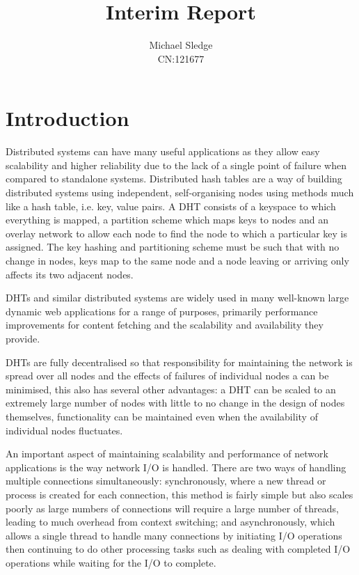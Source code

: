 \documentclass{article}
\begin{document}
\title{Interim Report}
\author{Michael Sledge\\ CN:121677}
\date{}
\maketitle
\section{Introduction}
Distributed systems can have many useful applications as they allow easy scalability and higher reliability due to the lack of a single point of failure when compared to standalone systems. Distributed hash tables are a way of building distributed systems using independent, self-organising nodes using methods much like a hash table, i.e. key, value pairs.  A DHT consists of a keyspace to which everything is mapped, a partition scheme which maps keys to nodes and an overlay network to allow each node to find the node to which a particular key is assigned. The key hashing and partitioning scheme must be such that with no change in nodes, keys map to the same node and a node leaving or arriving only affects its two adjacent nodes.

DHTs and similar distributed systems are widely used in many well-known large dynamic web applications for a range of purposes, primarily performance improvements for content fetching and the scalability and availability they provide.

DHTs are fully decentralised so that responsibility for maintaining the network is spread over all nodes and the effects of failures of individual nodes a can be minimised, this also has several other advantages: a DHT can be scaled to an extremely large number of nodes with little to no change in the design of nodes themselves, functionality can be maintained even when the availability of individual nodes fluctuates.

An important aspect of maintaining scalability and performance of network applications is the way network I/O is handled. There are two ways of handling multiple connections simultaneously: synchronously, where a new thread or process is created for each connection, this method is fairly simple but also scales poorly as large numbers of connections will require a large number of threads, leading to much overhead from context switching; and asynchronously, which allows a single thread to handle many connections by initiating I/O operations then continuing to do other processing tasks such as dealing with completed I/O operations while waiting for the I/O to complete.
\end{document}
